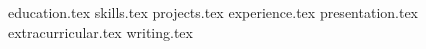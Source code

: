 \documentclass[11pt, a4paper]{awesome-cv}
\newcommand*{\sectiondir}{resume/}
\begin{document}
\makecvheader

{education.tex}
{skills.tex}
{projects.tex}
{experience.tex}
{presentation.tex}
{extracurricular.tex}
{writing.tex}
\end{document}
